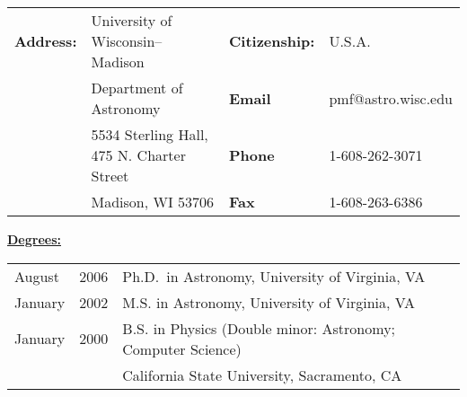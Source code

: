 \documentclass[12pt]{article}
\begin{document}
\def\pos{\medskip\quad}
\def\subpos{\smallskip \qquad}

\vskip -0.2in
\begin{tabular}{llll}
{\bf Address:}         & University of Wisconsin--Madison   & {\bf Citizenship:} & U.S.A. \\ %
& Department of Astronomy & {\bf Email}  & pmf@astro.wisc.edu\\
& 5534 Sterling Hall, 475 N. Charter Street\phantom{y}& {\bf Phone}        & 1-608-262-3071\\
&Madison, WI 53706& {\bf Fax}       & 1-608-263-6386
\end{tabular}


\noindent \underline{\bf Degrees:}         \\
\begin{tabular}{lll}
August &2006& Ph.D.\ in Astronomy, University of Virginia, VA\\
January &2002& M.S. in Astronomy, University of Virginia, VA \\
January &2000& B.S. in Physics (Double minor: Astronomy; Computer Science)\\
     &    &     California State University, Sacramento, CA \\
\end{tabular}
\end{document}
